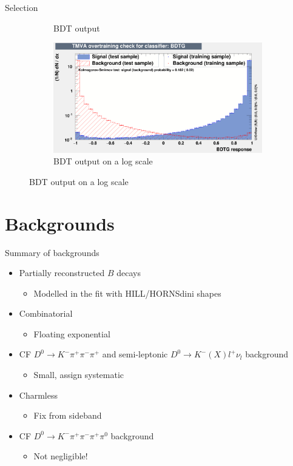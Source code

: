 \documentclass{beamer}
\begin{document}
\begin{frame}{Selection}
\begin{figure}
\begin{subfigure}{0.4\textwidth}
      \caption{BDT output}
    \end{subfigure}%
    \begin{subfigure}{0.4\textwidth}
      \includegraphics[width = 1.0\textwidth]{Plots/overtrain_BDTG_log.png}
      \caption{BDT output on a log scale}
    \end{subfigure}
  \end{figure}
\end{frame}

\section{Backgrounds}

\begin{frame}{Summary of backgrounds}
  \begin{itemize}
    \setlength\itemsep{1.0em}
    \item{Partially reconstructed $B$ decays}
    \begin{itemize}
      \item{Modelled in the fit with HILL/HORNSdini shapes}
    \end{itemize}
    \item{Combinatorial}
    \begin{itemize}
      \item{Floating exponential}
    \end{itemize}
    \item{CF $D^0\to K^-\pi^+\pi^-\pi^+$ and semi-leptonic $D^0\to K^-(X)l^+\nu_l$ background}
    \begin{itemize}
      \item{Small, assign systematic}
    \end{itemize}
    \item{Charmless}
    \begin{itemize}
      \item{Fix from sideband}
    \end{itemize}
    \item{CF $D^0\to K^-\pi^+\pi^-\pi^+\pi^0$ background}
    \begin{itemize}
      \item{Not negligible!}
    \end{itemize}
  \end{itemize}
\end{frame}
\end{document}
